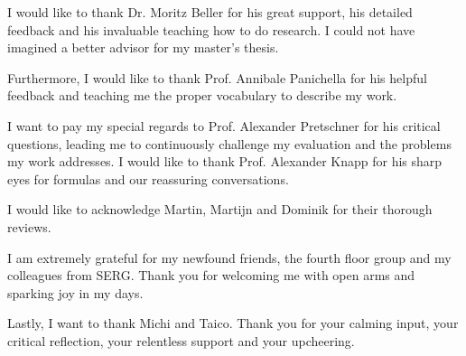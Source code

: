 \documentclass[\myrootdir/main.tex]{subfiles}
\begin{document}
\thispagestyle{empty}

\vspace*{2cm}

\begin{center}
{ \myAcknowTitle}
\end{center}

\vspace{1cm}
\noindent
I would like to thank Dr. Moritz Beller for his great support, his detailed feedback and his invaluable teaching how to do research.
I could not have imagined a better advisor for my master's thesis.

\noindent
Furthermore, I would like to thank Prof. Annibale Panichella for his helpful feedback and teaching me the proper vocabulary to describe my work.

\noindent
I want to pay my special regards to Prof. Alexander Pretschner for his critical questions, leading me to continuously challenge my evaluation and the problems my work addresses.
I would like to thank Prof. Alexander Knapp for his sharp eyes for formulas and our reassuring conversations.

\noindent
I would like to acknowledge Martin, Martijn and Dominik for their thorough reviews.

\noindent
I am extremely grateful for my newfound friends, the fourth floor group and my colleagues from SERG.
Thank you for welcoming me with open arms and sparking joy in my days.

\noindent
Lastly, I want to thank Michi and Taico.
Thank you for your calming input, your critical reflection, your relentless support and  your upcheering.

\end{document}
